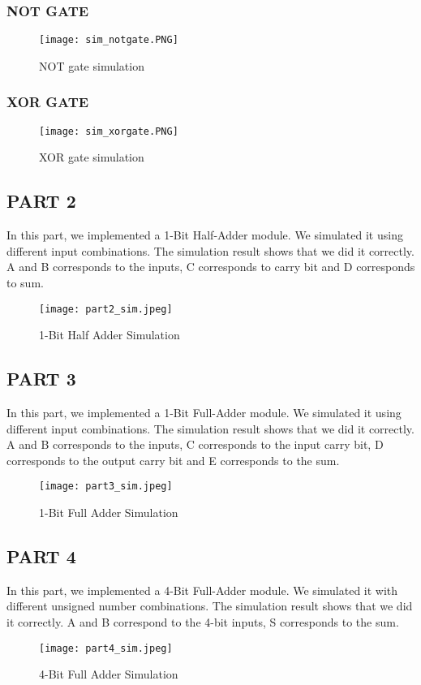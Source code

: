\documentclass[pdftex,12pt,a4paper]{article}
\begin{document}
\subsubsection{NOT GATE}

\begin{figure}[ht]
	\centering
	\texttt{[image: sim\_notgate.PNG]}	
	\caption{NOT gate simulation}
	\label{fig11}
\end{figure}

\subsubsection{XOR GATE}
\begin{figure}[ht]
	\centering
	\texttt{[image: sim\_xorgate.PNG]}	
	\caption{XOR gate simulation}
	\label{fig12}
\end{figure}
\clearpage

\subsection{PART 2}
In this part, we implemented a 1-Bit Half-Adder module. We simulated it using different input combinations. The simulation result shows that we did it correctly. A and B corresponds to the inputs, C corresponds to carry bit and D corresponds to sum.

\begin{figure}[ht]
	\centering
	\texttt{[image: part2\_sim.jpeg]}	
	\caption{1-Bit Half Adder Simulation}
	\label{fig20}
\end{figure}

\subsection{PART 3}
In this part, we implemented a 1-Bit Full-Adder module. We simulated it using different input combinations. The simulation result shows that we did it correctly. A and B corresponds to the inputs, C corresponds to the input carry bit, D corresponds to the output carry bit and E corresponds to the sum.
\begin{figure}[ht]
	\centering
	\texttt{[image: part3\_sim.jpeg]}	
	\caption{1-Bit Full Adder Simulation}
	\label{fig20}
\end{figure}

\subsection{PART 4}
In this part, we implemented a 4-Bit Full-Adder module. We simulated it with different unsigned number combinations. The simulation result shows that we did it correctly. A and B correspond to the 4-bit inputs, S corresponds to the sum.
\begin{figure}[ht]
	\centering
	\texttt{[image: part4\_sim.jpeg]}	
	\caption{4-Bit Full Adder Simulation}
	\label{fig13}
\end{figure}
\clearpage
\end{document}
